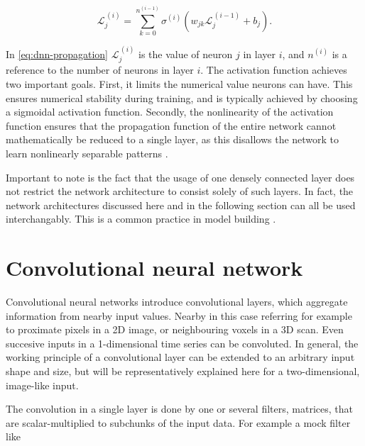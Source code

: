 \begin{equation}
\label{eq:dnn-propagation}
\mathcal{L}_j^{\,(i)} = \sum\limits_{k = 0}^{n^{(i-1)}} \sigma^{(i)}\left( w_{jk} \mathcal{L}_j^{\,(i-1)} + b_j\right).
\end{equation}

In \autoref{eq:dnn-propagation} $\mathcal{L}_j^{\,(i)}$ is the value of neuron $j$ in layer $i$, and $n^{(i)}$ is a reference to the number of neurons in 
layer $i$. The activation function achieves two important goals. First, it limits the numerical value neurons can have. This ensures numerical stability
during training, and is typically achieved by choosing a sigmoidal activation function. Secondly, the nonlinearity of the activation function ensures that 
the propagation function of the entire network cannot mathematically be reduced to a single layer, as this disallows the network to learn nonlinearly 
separable patterns \cite{russell2010artificial}. 

Important to note is the fact that the usage of one densely connected layer does not restrict the network architecture to consist solely of such layers. 
In fact, the network architectures discussed here and in the following section can all be used interchangably. This is a common practice in model building
\cite{szegedy2015going, krizhevsky2017imagenet}.


\section{Convolutional neural network}
\label{sec:CNN}

Convolutional neural networks introduce convolutional layers, which aggregate information from nearby input values. Nearby in this case referring for example 
to proximate pixels in a 2D image, or neighbouring voxels in a 3D scan. Even succesive inputs in a 1-dimensional time series can be convoluted. In general, 
the working principle of a convolutional layer can be extended to an arbitrary input shape and size, but will be representatively explained here for a 
two-dimensional, image-like input.

The convolution in a single layer is done by one or several filters, matrices, that are scalar-multiplied to subchunks of the input data. For example a mock 
filter like

